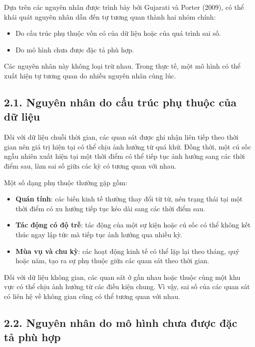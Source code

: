 \documentclass[12pt,a4paper]{article}
\begin{document}
Dựa trên các nguyên nhân được trình bày bởi Gujarati và Porter (2009), có thể khái quát nguyên nhân dẫn đến tự tương quan thành hai nhóm chính:

\begin{itemize}
    \item Do cấu trúc phụ thuộc vốn có của dữ liệu hoặc của quá trình sai số.
    \item Do mô hình chưa được đặc tả phù hợp.
\end{itemize}

Các nguyên nhân này không loại trừ nhau. Trong thực tế, một mô hình có thể xuất hiện tự tương quan do nhiều nguyên nhân cùng lúc.

\subsection{2.1. Nguyên nhân do cấu trúc phụ thuộc của dữ liệu}

Đối với dữ liệu chuỗi thời gian, các quan sát được ghi nhận liên tiếp theo thời gian nên giá trị hiện tại có thể chịu ảnh hưởng từ quá khứ. Đồng thời, một cú sốc ngẫu nhiên xuất hiện tại một thời điểm có thể tiếp tục ảnh hưởng sang các thời điểm sau, làm sai số giữa các kỳ có tương quan với nhau.

Một số dạng phụ thuộc thường gặp gồm:

\begin{itemize}
    \item \textbf{Quán tính}: các biến kinh tế thường thay đổi từ từ, nên trạng thái tại một thời điểm có xu hướng tiếp tục kéo dài sang các thời điểm sau.
    
    \item \textbf{Tác động có độ trễ}: tác động của một sự kiện hoặc cú sốc có thể không kết thúc ngay lập tức mà tiếp tục ảnh hưởng qua nhiều kỳ.
    
    \item \textbf{Mùa vụ và chu kỳ}: các hoạt động kinh tế có thể lặp lại theo tháng, quý hoặc năm, tạo ra sự phụ thuộc giữa các quan sát theo thời gian.
\end{itemize}

Đối với dữ liệu không gian, các quan sát ở gần nhau hoặc thuộc cùng một khu vực có thể chịu ảnh hưởng từ các điều kiện chung. Vì vậy, sai số của các quan sát có liên hệ về không gian cũng có thể tương quan với nhau.

\subsection{2.2. Nguyên nhân do mô hình chưa được đặc tả phù hợp}
\end{document}
